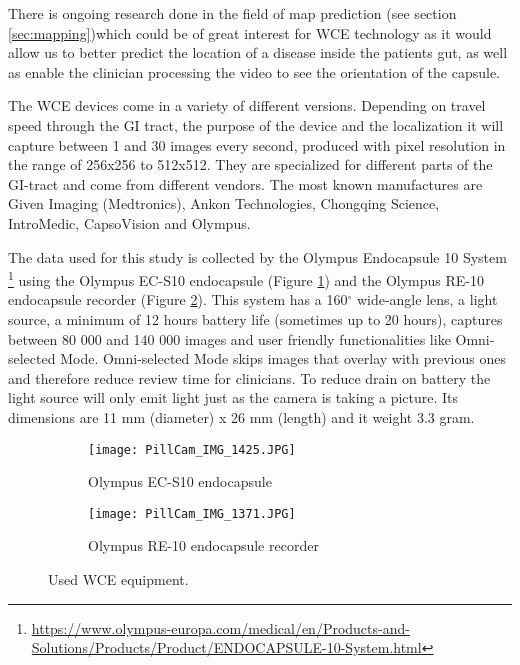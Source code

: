 \documentclass[thesis.tex]{subfiles}
\begin{document}
There is ongoing research done in the field of map prediction (see section \ref{sec:mapping})which could be of great interest for WCE technology as it would allow us to better predict the location of a disease inside the patients gut, as well as enable the clinician processing the video to see the orientation of the capsule.

The WCE devices come in a variety of different versions. Depending on travel speed through the GI tract, the purpose of the device and the localization it will capture between 1 and 30 images every second, produced with pixel resolution in the range of 256x256 to 512x512. They are specialized for different parts of the GI-tract and come from different vendors. The most known manufactures are Given Imaging (Medtronics), Ankon Technologies, Chongqing Science, IntroMedic, CapsoVision and Olympus.

The data used for this study is collected by the Olympus Endocapsule 10 System \footnote{\url{https://www.olympus-europa.com/medical/en/Products-and-Solutions/Products/Product/ENDOCAPSULE-10-System.html}} using the Olympus EC-S10 endocapsule (Figure \ref{fig:ec-s10}) and the Olympus RE-10 endocapsule recorder (Figure \ref{fig:re-10}). This system has a 160$^{\circ}$ wide-angle lens, a light source, a minimum of 12 hours battery life (sometimes up to 20 hours), captures between 80 000 and 140 000 images and user friendly functionalities like Omni-selected Mode. Omni-selected Mode skips images that overlay with previous ones and therefore reduce review time for clinicians. To reduce drain on battery the light source will only emit light just as the camera is taking a picture. Its dimensions are 11 mm (diameter) x 26 mm (length) and it weight 3.3 gram.

\begin{figure} %
  \centering
  \begin{subfigure}[b]{0.4\linewidth}
    \centering
    \texttt{[image: PillCam\_IMG\_1425.JPG]}
    \caption{Olympus EC-S10 endocapsule}
    \label{fig:ec-s10}
  \end{subfigure}
  \begin{subfigure}[b]{0.4\linewidth}
    \centering
    \texttt{[image: PillCam\_IMG\_1371.JPG]}
    \caption{Olympus RE-10 endocapsule recorder}
    \label{fig:re-10}
  \end{subfigure}
  \caption[Used WCE equipment.]{Used WCE equipment.}
  \label{fig:olympus_endocapsule_10}
\end{figure}
\end{document}
